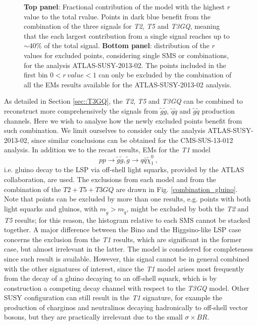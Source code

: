 \documentclass[epj,nopacs,fleqn]{svjour}
\begin{document}
\begin{figure}[!]
\begin{center}
	\end{center}
	\caption{\textbf{Top panel}: Fractional contribution of the model with the highest $r$ value to the total rvalue. Points in dark blue benefit from the combination of the three signals for \textit{T2}, \textit{T5} and \textit{T3GQ}, meaning that the each largest contribution from a single signal reaches up to $\sim 40\%$ of the total signal. \textbf{Bottom panel}: distribution of the $r$ values for excluded points, considering single SMS or combinations, for the analysis ATLAS-SUSY-2013-02. The points included in the first bin $0<r \ value < 1$ can only be excluded by the combination of all the EMs results available for the ATLAS-SUSY-2013-02 analysis.} 
\end{figure}
As detailed in Section \ref{sec::T3GQ}, the \textit{T2}, \textit{T5} and \textit{T3GQ} can be combined to reconstruct more comprehensively the signals from $\tilde g \tilde g$, $\tilde q \tilde q$ and $\tilde g \tilde q$ production channels. Here we wish to analyse how the newly excluded points benefit from such combination. We limit ourselves to consider only the analysis ATLAS-SUSY-2013-02, since similar conclusions can be obtained for the CMS-SUS-13-012 analysis. In addition we to the recast results, EMs for the \textit{T1} model 
\begin{equation}
p p \rightarrow \tilde g \tilde g , \tilde g \rightarrow q \bar q \tilde \chi_1 ^0 \ , 
\end{equation}
i.e. gluino decay to the LSP via off-shell light squarks, provided by the ATLAS collaboration, are used. The exclusions from each model and from the combination of the $T2+T5+T3GQ$ are drawn in Fig. \ref{combination_gluino}. 
%
%
Note that points can be excluded by more than one results, e.g. points with both light squarks and gluinos, with $m_{\tilde g} > m_{\tilde q}$, might be excluded by both the \textit{T2} and \textit{T5} results; for this reason, the histogram relative to each SMS cannot be stacked together. A major difference between the Bino and the Higgsino-like LSP case concerns the exclusion from the \textit{T1} results, which are significant in the former case, but almost irrelevant in the latter. The model is considered for completeness since such result is available. However, this signal cannot be in general combined with the other signatures of interest, since the \textit{T1} model arises most frequently from the decay of a gluino decaying to an off-shell squark, which is by construction a competing decay channel with respect to the \textit{T3GQ} model. Other SUSY configuration can still result in the \textit{T1} signature, for example the production of charginos and neutralinos decaying hadronically to off-shell vector bosons, but they are practically irrelevant due to the small $\sigma \times BR$.  
\end{document}
